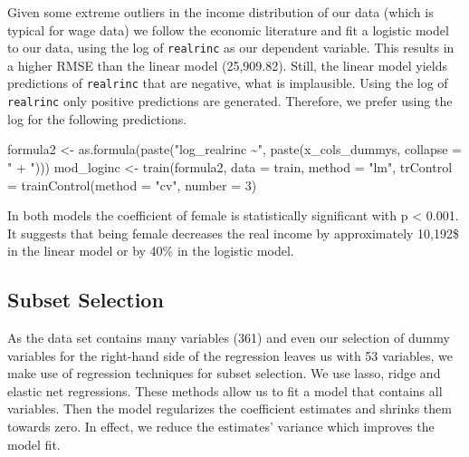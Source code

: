\documentclass[11pt,a4paper]{article}
\newenvironment{Shaded}{\begin{snugshade}}{\end{snugshade}}
\newcommand{\AttributeTok}[1]{\textcolor[rgb]{0.77,0.63,0.00}{#1}}
\newcommand{\DecValTok}[1]{\textcolor[rgb]{0.00,0.00,0.81}{#1}}
\newcommand{\FunctionTok}[1]{\textcolor[rgb]{0.00,0.00,0.00}{#1}}
\newcommand{\NormalTok}[1]{#1}
\newcommand{\OtherTok}[1]{\textcolor[rgb]{0.56,0.35,0.01}{#1}}
\newcommand{\StringTok}[1]{\textcolor[rgb]{0.31,0.60,0.02}{#1}}
\begin{document}
Given some extreme outliers in the income distribution of our data
(which is typical for wage data) we follow the economic literature
\autocite{Ermini} and fit a logistic model to our data, using the log of
\texttt{realrinc} as our dependent variable. This results in a higher
RMSE than the linear model (25,909.82). Still, the linear model yields
predictions of \texttt{realrinc} that are negative, what is implausible.
Using the log of \texttt{realrinc} only positive predictions are
generated. Therefore, we prefer using the log for the following
predictions.

\begin{Shaded}
\begin{Highlighting}[]
\NormalTok{formula2 }\OtherTok{\textless{}{-}} \FunctionTok{as.formula}\NormalTok{(}\FunctionTok{paste}\NormalTok{(}\StringTok{"log\_realrinc \textasciitilde{}"}\NormalTok{, }
                              \FunctionTok{paste}\NormalTok{(x\_cols\_dummys, }\AttributeTok{collapse =} \StringTok{" + "}\NormalTok{)))}
\NormalTok{mod\_loginc }\OtherTok{\textless{}{-}} \FunctionTok{train}\NormalTok{(formula2,}
                    \AttributeTok{data =}\NormalTok{ train, }
                    \AttributeTok{method =} \StringTok{"lm"}\NormalTok{,  }
                    \AttributeTok{trControl =} \FunctionTok{trainControl}\NormalTok{(}\AttributeTok{method =} \StringTok{"cv"}\NormalTok{, }\AttributeTok{number =} \DecValTok{3}\NormalTok{)}
\end{Highlighting}
\end{Shaded}

In both models the coefficient of female is statistically significant
with p \textless{} 0.001. It suggests that being female decreases the
real income by approximately 10,192\$ in the linear model or by 40\% in
the logistic model.

\hypertarget{subset-selection}{%
\subsection{Subset Selection}\label{subset-selection}}

As the data set contains many variables (361) and even our selection of
dummy variables for the right-hand side of the regression leaves us with
53 variables, we make use of regression techniques for subset selection.
We use lasso, ridge and elastic net regressions. These methods allow us
to fit a model that contains all variables. Then the model regularizes
the coefficient estimates and shrinks them towards zero. In effect, we
reduce the estimates' variance which improves the model fit.
\end{document}
